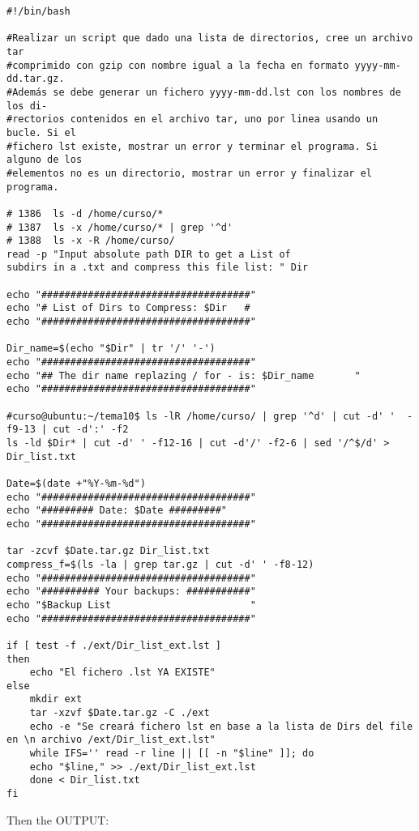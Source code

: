 \documentclass[a4paper,11pt,spanish]{article} %
\newenvironment{myscriptlisting}
{\begin{list}{}{\setlength{\leftmargin}{1em}}\item\scriptsize\bfseries}
{\end{list}}
\begin{document}
\begin{myscriptlisting}
 \begin{verbatim}
#!/bin/bash

#Realizar un script que dado una lista de directorios, cree un archivo tar
#comprimido con gzip con nombre igual a la fecha en formato yyyy-mm-dd.tar.gz.
#Además se debe generar un fichero yyyy-mm-dd.lst con los nombres de los di-
#rectorios contenidos en el archivo tar, uno por linea usando un bucle. Si el
#fichero lst existe, mostrar un error y terminar el programa. Si alguno de los
#elementos no es un directorio, mostrar un error y finalizar el programa.

# 1386  ls -d /home/curso/*
# 1387  ls -x /home/curso/* | grep '^d'
# 1388  ls -x -R /home/curso/
read -p "Input absolute path DIR to get a List of
subdirs in a .txt and compress this file list: " Dir

echo "####################################"
echo "# List of Dirs to Compress: $Dir   #
echo "####################################"

Dir_name=$(echo "$Dir" | tr '/' '-')
echo "####################################"
echo "## The dir name replazing / for - is: $Dir_name       "
echo "####################################"

#curso@ubuntu:~/tema10$ ls -lR /home/curso/ | grep '^d' | cut -d' '  -f9-13 | cut -d':' -f2
ls -ld $Dir* | cut -d' ' -f12-16 | cut -d'/' -f2-6 | sed '/^$/d' > Dir_list.txt

Date=$(date +"%Y-%m-%d")
echo "####################################"
echo "######### Date: $Date #########"
echo "####################################"

tar -zcvf $Date.tar.gz Dir_list.txt
compress_f=$(ls -la | grep tar.gz | cut -d' ' -f8-12)
echo "####################################"
echo "########## Your backups: ###########"
echo "$Backup List                        "
echo "####################################"

if [ test -f ./ext/Dir_list_ext.lst ]   
then
	echo "El fichero .lst YA EXISTE"
else
	mkdir ext
	tar -xzvf $Date.tar.gz -C ./ext
	echo -e "Se creará fichero lst en base a la lista de Dirs del file en \n archivo /ext/Dir_list_ext.lst"
	while IFS='' read -r line || [[ -n "$line" ]]; do
    echo "$line," >> ./ext/Dir_list_ext.lst
	done < Dir_list.txt
fi
 \end{verbatim}
\end{myscriptlisting}

Then the OUTPUT:
\end{document}
